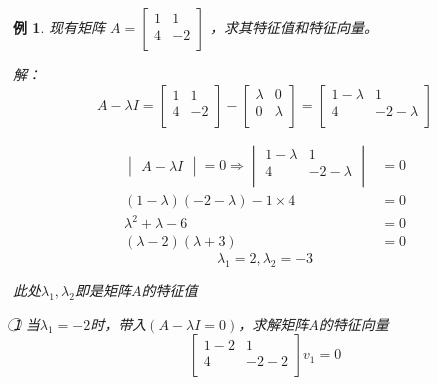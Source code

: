 \documentclass[12pt, a4paper, oneside]{ctexbook}
\newtheorem{example}[theorem]{例}
\begin{document}
\begin{example}
    现有矩阵
    $A=
    \left[
        \begin{matrix}
            1 & 1 \\
            4 & -2 \\
        \end{matrix}
    \right]
    $
    ，求其特征值和特征向量。




    解：
    $$
    A-\lambda I=
    \left[
        \begin{matrix}
            1 & 1 \\
            4 & -2 \\
        \end{matrix}
    \right]-
    \left[
        \begin{matrix}
            \lambda & 0 \\
            0 & \lambda \\
        \end{matrix}
    \right]=
    \left[
        \begin{matrix}
            1-\lambda & 1 \\
            4 & -2-\lambda \\
        \end{matrix}
    \right]
    $$


    \begin{align}
        \begin{vmatrix}
            A-\lambda I
        \end{vmatrix}=0
        \Rightarrow
        \begin{vmatrix}
            1-\lambda & 1 \\
            4 & -2-\lambda \\
        \end{vmatrix}
        &=0
        \nonumber
        \\
        (1-\lambda)(-2-\lambda)-1\times 4&=0
        \nonumber
        \\
        \lambda^2 + \lambda -6&=0
        \nonumber
        \\
        (\lambda-2)(\lambda+3)&=0
        \nonumber
    \end{align}
    $$
    \lambda_1=2,\lambda_2=-3
    $$

    此处$\lambda_1,\lambda_2$即是矩阵$A$的特征值

    \textcircled{1} 当$\lambda_1=-2$时，带入$(A-\lambda I=0)$，求解矩阵$A$的特征向量
    $$
    \left[
        \begin{matrix}
            1-2 & 1 \\
            4 & -2-2 \\
        \end{matrix}
    \right]
    v_1=0
    $$


\end{example}
\end{document}
